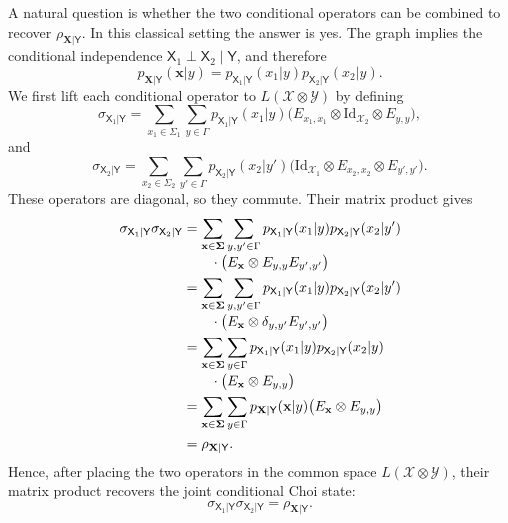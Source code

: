 \documentclass[
    aps,
    pra,
    reprint,
    superscriptaddress,
    nofootinbib
]{revtex4-2}
\theoremstyle{definition}
\theoremstyle{plain}
\begin{document}
A natural question is whether the two conditional operators can be
combined to recover $\rho_{\mathbf{X}|\mathsf{Y}}$. In this classical
setting the answer is yes. The graph implies the conditional independence
$\mathsf{X}_{1}\perp\mathsf{X}_{2}\mid\mathsf{Y}$, and therefore
\begin{equation}
    p_{\mathbf{X}|\mathsf{Y}}(\mathbf{x}|y)
    =
    p_{\mathsf{X}_{1}|\mathsf{Y}}(x_{1}|y)
    p_{\mathsf{X}_{2}|\mathsf{Y}}(x_{2}|y).
\end{equation}
We first lift each conditional operator to
$L(\mathcal{X}\otimes\mathcal{Y})$ by defining
\begin{equation}
    \sigma_{\mathsf{X}_{1}|\mathsf{Y}}
    =
    \sum_{x_{1}\in\Sigma_{1}}\sum_{y\in\Gamma}
    p_{\mathsf{X}_{1}|\mathsf{Y}}(x_{1}|y)
    \bigl(
        E_{x_{1},x_{1}}
        \otimes\mathrm{Id}_{\mathcal{X}_{2}}
        \otimes E_{y,y}
    \bigr),
\end{equation}
and
\begin{equation}
    \sigma_{\mathsf{X}_{2}|\mathsf{Y}}
    =
    \sum_{x_{2}\in\Sigma_{2}}\sum_{y'\in\Gamma}
    p_{\mathsf{X}_{2}|\mathsf{Y}}(x_{2}|y')
    \bigl(
        \mathrm{Id}_{\mathcal{X}_{1}}
        \otimes E_{x_{2},x_{2}}
        \otimes E_{y',y'}
    \bigr).
\end{equation}
These operators are diagonal, so they commute. Their matrix product gives
\begin{align}
    \sigma_{\mathsf{X}_{1}|\mathsf{Y}}
    \sigma_{\mathsf{X}_{2}|\mathsf{Y}}
    &=
    \sum_{\mathbf{x}\in\boldsymbol{\Sigma}}
    \sum_{y,y'\in\Gamma}
    p_{\mathsf{X}_{1}|\mathsf{Y}}(x_{1}|y)
    p_{\mathsf{X}_{2}|\mathsf{Y}}(x_{2}|y')
    \notag\\[-0.25em]
    &\qquad\cdot
    \bigl(
        E_{\mathbf{x}}\otimes E_{y,y}E_{y',y'}
    \bigr)\\
    &=
    \sum_{\mathbf{x}\in\boldsymbol{\Sigma}}
    \sum_{y,y'\in\Gamma}
    p_{\mathsf{X}_{1}|\mathsf{Y}}(x_{1}|y)
    p_{\mathsf{X}_{2}|\mathsf{Y}}(x_{2}|y')
    \notag\\[-0.25em]
    &\qquad\cdot
    \bigl(
        E_{\mathbf{x}}\otimes
        \delta_{y,y'}E_{y',y'}
    \bigr)\\
    &=
    \sum_{\mathbf{x}\in\boldsymbol{\Sigma}}
    \sum_{y\in\Gamma}
    p_{\mathsf{X}_{1}|\mathsf{Y}}(x_{1}|y)
    p_{\mathsf{X}_{2}|\mathsf{Y}}(x_{2}|y)
    \notag\\[-0.25em]
    &\qquad\cdot
    \bigl(E_{\mathbf{x}}\otimes E_{y,y}\bigr)
    \label{eq:factor-equation}\\
    &=
    \sum_{\mathbf{x}\in\boldsymbol{\Sigma}}
    \sum_{y\in\Gamma}
    p_{\mathbf{X}|\mathsf{Y}}(\mathbf{x}|y)
    \bigl(E_{\mathbf{x}}\otimes E_{y,y}\bigr)\\
    &=
    \rho_{\mathbf{X}|\mathsf{Y}}.
\end{align}
Hence, after placing the two operators in the common space
$L(\mathcal{X}\otimes\mathcal{Y})$, their matrix product recovers the joint
conditional Choi state:
\begin{equation}
    \sigma_{\mathsf{X}_{1}|\mathsf{Y}}
    \sigma_{\mathsf{X}_{2}|\mathsf{Y}}
    =
    \rho_{\mathbf{X}|\mathsf{Y}}.
\end{equation}
\end{document}
